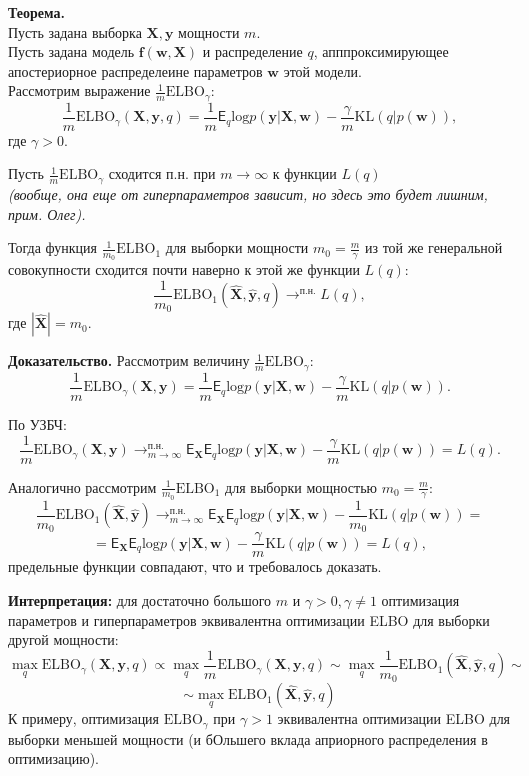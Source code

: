 \documentclass{article}
\begin{document}
\textbf{Теорема.}\\
Пусть задана выборка $\mathbf{X}, \mathbf{y}$ мощности $m$.\\
Пусть задана модель $\mathbf{f}(\mathbf{w}, \mathbf{X})$ и распределение $q$, апппроксимирующее апостериорное распределеине параметров $\mathbf{w}$ этой модели.\\
Рассмотрим выражение $\frac{1}{m} \text{ELBO}_{\gamma}$:\\
\[
    \frac{1}{m}\text{ELBO}_{\gamma}(\mathbf{X}, \mathbf{y}, q)= \frac{1}{m}\mathsf{E}_q \text{log}p(\mathbf{y}|\mathbf{X}, \mathbf{w}) - \frac{\gamma}{m}\text{KL}(q|p(\mathbf{w})),
\]
где $\gamma > 0$.

Пусть $\frac{1}{m} \text{ELBO}_{\gamma}$ сходится п.н. при $m \to \infty$ к функции $L(q)$\\ \textit{(вообще, она еще от гиперпараметров зависит, но здесь это будет лишним, прим. Олег).}

Тогда функция $\frac{1}{m_0} \text{ELBO}_{1}$ для  выборки мощности $m_0 = \frac{m}{\gamma}$ из той же генеральной совокупности сходится почти наверно к этой же функции $L(q)$:
\[
    \frac{1}{m_0} \text{ELBO}_{1}(\hat{\mathbf{X}}, \hat{\mathbf{y}}, q) \to^{\text{п.н.}} L(q),
\]
где $|\hat{\mathbf{X}}| = m_0$.

\textbf{Доказательство.} 
Рассмотрим величину  $\frac{1}{m}\text{ELBO}_{\gamma}$: \\
\[
    \frac{1}{m}\text{ELBO}_{\gamma}(\mathbf{X}, \mathbf{y})= \frac{1}{m}\mathsf{E}_q \text{log}p(\mathbf{y}|\mathbf{X}, \mathbf{w}) - \frac{\gamma}{m}\text{KL}(q|p(\mathbf{w})).
\]

По УЗБЧ: 
\[
    \frac{1}{m}\text{ELBO}_{\gamma}(\mathbf{X}, \mathbf{y}) \to_{m \to \infty}^{\text{п.н.}} \mathsf{E}_\mathbf{X}\mathsf{E}_{q} \text{log}p(\mathbf{y}|\mathbf{X}, \mathbf{w}) - \frac{\gamma}{m}\text{KL}(q|p(\mathbf{w})) = L(q).
\]

Аналогично рассмотрим $\frac{1}{m_0}\text{ELBO}_{1}$ для выборки мощностью $m_0 = \frac{m}{\gamma}$:
\[
    \frac{1}{m_0}\text{ELBO}_{1}(\hat{\mathbf{X}}, \hat{\mathbf{y}}) \to_{m \to \infty}^{\text{п.н.}} \mathsf{E}_\mathbf{X}\mathsf{E}_{q} \text{log}p(\mathbf{y}|\mathbf{X}, \mathbf{w}) - \frac{1}{m_0}\text{KL}(q|p(\mathbf{w})) = 
\]
\[
=  \mathsf{E}_\mathbf{X}\mathsf{E}_{q} \text{log}p(\mathbf{y}|\mathbf{X}, \mathbf{w}) - \frac{\gamma}{m}\text{KL}(q|p(\mathbf{w})) = L(q),
\]
предельные функции совпадают, что и требовалось доказать.

\textbf{Интерпретация: } для достаточно большого $m$ и $\gamma>0, \gamma \neq 1$ оптимизация параметров и гиперпараметров эквивалентна оптимизации ELBO для выборки другой мощности:
\[
    \max_q \text{ELBO}_{\gamma}(\mathbf{X}, \mathbf{y}, q) \propto  \max_q \frac{1}{m}\text{ELBO}_{\gamma}(\mathbf{X}, \mathbf{y}, q) \sim  \max_q \frac{1}{m_0}\text{ELBO}_{1}(\hat{\mathbf{X}}, \hat{\mathbf{y}}, q) \sim
\]
\[
\sim    \max_q \text{ELBO}_{1}(\hat{\mathbf{X}}, \hat{\mathbf{y}}, q)
\]
К примеру, оптимизация $\text{ELBO}_{\gamma}$ при $\gamma>1$ эквивалентна оптимизации ELBO для выборки меньшей мощности (и бОльшего вклада априорного распределения в оптимизацию).
\end{document}
